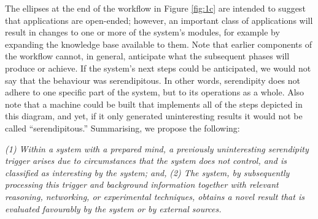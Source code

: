 The ellipses at the end of the workflow in Figure \ref{fig:1c} are
intended to suggest that applications are open-ended; however, an
important class of applications will result in changes to one or more
of the system's modules, for example by expanding the knowledge base
available to them.  Note that earlier components of the workflow
cannot, in general, anticipate what the subsequent phases will produce
or achieve.  If the system's next steps could be anticipated, we would
not say that the behaviour was serendipitous.  In other words,
serendipity does not adhere to one specific part of the system, but to
its operations as a whole.  Also note that a machine could be built
that implements all of the steps depicted in this diagram, and yet, if
it only generated uninteresting results it would not be called
``serendipitous.''  Summarising, we propose the following:
\begin{ndef}
\emph{(1) Within a system with a prepared mind, a previously uninteresting serendipity trigger arises due to circumstances that the system does not control, and is classified as interesting by the system; and,}
\emph{(2) The system, by subsequently processing this trigger and background information together with relevant reasoning, networking, or experimental techniques, obtains a novel result that is evaluated favourably by the system or by external sources.}
\end{ndef}


